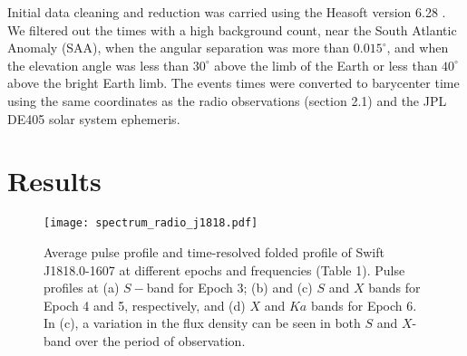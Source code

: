 \documentclass[twocolumn]{emulateapj}
\begin{document}
Initial data cleaning and reduction was carried using the Heasoft version 6.28 \citep{heasoft14}. We filtered out the times with a high background count, near the South Atlantic Anomaly (SAA), when the angular separation was more than $0.015^{\circ}$, and when the elevation angle was less than $30^{\circ}$ above the limb of the Earth or less than $40^{\circ}$ above the bright Earth limb. The events times were converted to barycenter time using the same coordinates as the radio observations (section 2.1) and the JPL DE405 solar system ephemeris.%
 



\section{Results}





\begin{figure*}[b]
	\centering
	\texttt{[image: spectrum\_radio\_j1818.pdf]}
	\caption{ Average pulse profile and time-resolved folded profile of Swift J1818.0-1607 at different epochs and frequencies (Table 1). Pulse profiles at (a) $S-$band for Epoch 3; (b) and (c) $S$ and $X$ bands for Epoch 4 and 5, respectively, and (d) $X$ and $Ka$ bands for Epoch 6. In (c), a variation in the flux density can be seen in both $S$ and $X$-band over the period of observation.}
	\label{Figure:Figure3}
\end{figure*}
\end{document}
